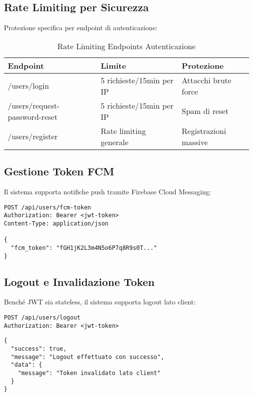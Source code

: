 \subsection{Rate Limiting per Sicurezza}
Protezione specifica per endpoint di autenticazione:

\begin{table}[H]
\centering
\begin{tabular}{@{}lll@{}}
\toprule
\textbf{Endpoint} & \textbf{Limite} & \textbf{Protezione} \\
\midrule
/users/login & 5 richieste/15min per IP & Attacchi brute force \\
/users/request-password-reset & 5 richieste/15min per IP & Spam di reset \\
/users/register & Rate limiting generale & Registrazioni massive \\
\bottomrule
\end{tabular}
\caption{Rate Limiting Endpoints Autenticazione}
\end{table}

\subsection{Gestione Token FCM}
Il sistema supporta notifiche push tramite Firebase Cloud Messaging:

\begin{lstlisting}[style=httpstyle, caption=Salvataggio Token FCM]
POST /api/users/fcm-token
Authorization: Bearer <jwt-token>
Content-Type: application/json

{
  "fcm_token": "fGH1jK2L3m4N5o6P7q8R9s0T..."
}
\end{lstlisting}

\subsection{Logout e Invalidazione Token}
Benché JWT sia stateless, il sistema supporta logout lato client:

\begin{lstlisting}[style=httpstyle, caption=Endpoint Logout]
POST /api/users/logout
Authorization: Bearer <jwt-token>
\end{lstlisting}

\begin{lstlisting}[caption=Risposta Logout]
{
  "success": true,
  "message": "Logout effettuato con successo",
  "data": {
    "message": "Token invalidato lato client"
  }
}
\end{lstlisting}

